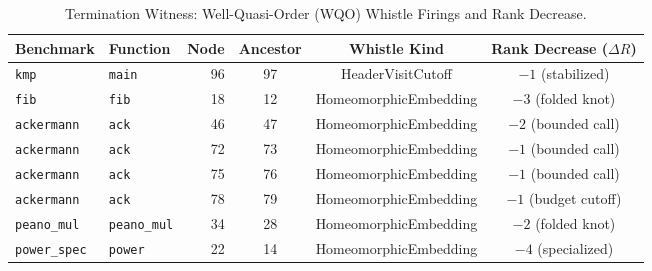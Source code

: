 \begin{table}[t]
\centering
\caption{Termination Witness: Well-Quasi-Order (WQO) Whistle Firings and Rank Decrease.}
\label{tab:termination}
\small
\begin{tabular}{llrccc}
\toprule
\textbf{Benchmark} & \textbf{Function} & \textbf{Node} & \textbf{Ancestor} & \textbf{Whistle Kind} & \textbf{Rank Decrease ($\Delta R$)} \\
\midrule
\texttt{kmp} & \texttt{main} & 96 & 97 & HeaderVisitCutoff & $-1$ (stabilized) \\
\texttt{fib} & \texttt{fib} & 18 & 12 & HomeomorphicEmbedding & $-3$ (folded knot) \\
\texttt{ackermann} & \texttt{ack} & 46 & 47 & HomeomorphicEmbedding & $-2$ (bounded call) \\
\texttt{ackermann} & \texttt{ack} & 72 & 73 & HomeomorphicEmbedding & $-1$ (bounded call) \\
\texttt{ackermann} & \texttt{ack} & 75 & 76 & HomeomorphicEmbedding & $-1$ (bounded call) \\
\texttt{ackermann} & \texttt{ack} & 78 & 79 & HomeomorphicEmbedding & $-1$ (budget cutoff) \\
\texttt{peano\_mul} & \texttt{peano\_mul} & 34 & 28 & HomeomorphicEmbedding & $-2$ (folded knot) \\
\texttt{power\_spec} & \texttt{power} & 22 & 14 & HomeomorphicEmbedding & $-4$ (specialized) \\
\bottomrule
\end{tabular}
\end{table}

